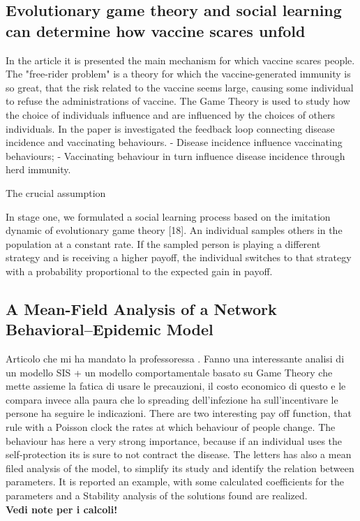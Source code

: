 \documentclass[a4paper,11pt]{scrartcl}
\begin{document}
	\subsection{Evolutionary game theory and social learning can determine how vaccine scares unfold}
	In the article \cite{Bauch2012} it is presented the main mechanism for which vaccine scares people. The "free-rider problem" is a theory for which the vaccine-generated immunity is so great, that the risk related to the vaccine seems large, causing some individual to refuse the administrations of vaccine.
	The Game Theory is used to study how the choice of individuals influence and are influenced by the choices of others individuals. 
	In the paper is investigated the feedback loop connecting disease incidence and vaccinating behaviours. 
	- Disease incidence influence vaccinating behaviours;
	- Vaccinating behaviour in turn influence disease incidence through herd immunity. 
	
	The crucial assumption
	
	In stage one, we formulated a social learning process based on the imitation dynamic of evolutionary game theory [18]. An individual samples others in the population at a constant rate. If the sampled person is playing a different strategy and is receiving a higher payoff, the individual switches to that strategy with a probability proportional to the expected gain in payoff.
	
	
	\subsection{A Mean-Field Analysis of a Network Behavioral–Epidemic Model}
	
	Articolo che mi ha mandato la professoressa \cite{Frieswijk2022}. Fanno una interessante analisi di un modello SIS + un modello comportamentale basato su Game Theory che mette assieme la fatica di usare le precauzioni, il costo economico di questo e le compara invece alla paura che lo spreading dell'infezione ha sull'incentivare le persone ha seguire le indicazioni.
	There are two interesting pay off function, that rule with a Poisson clock the rates at which behaviour of people change. 
	The behaviour has here a very strong importance, because if an individual uses the self-protection its is sure to not contract the disease. 
	The letters has also a mean filed analysis of the model, to simplify its study and identify the relation between parameters. It is reported an example, with some calculated coefficients for the parameters and a Stability analysis of the solutions found are realized. 
	\\
	\textbf{Vedi note per i calcoli!} 
	
\end{document}
